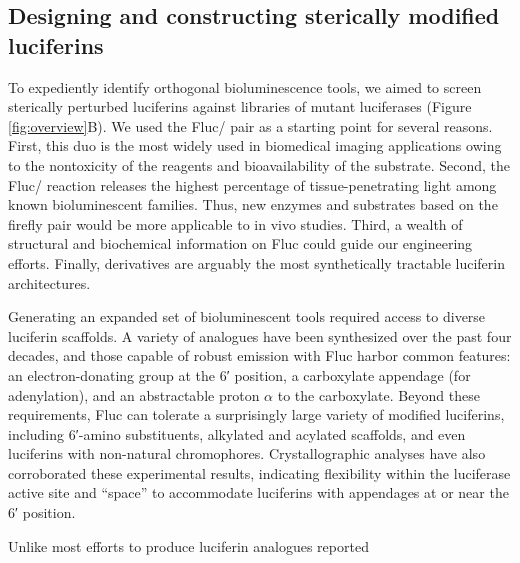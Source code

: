 \subsection*{Designing and constructing sterically modified luciferins}
To expediently identify orthogonal bioluminescence
tools, we aimed to screen sterically perturbed luciferins
against libraries of mutant luciferases (Figure \ref{fig:overview}B). We used the
Fluc/\dluciferin{} pair as a starting point for several reasons. First,
this duo is the most widely used in biomedical imaging
applications owing to the nontoxicity of the reagents and
bioavailability of the substrate.\cite{Berger:2008eq, Contag:1997kh} Second, the Fluc/\dluciferin{}
reaction releases the highest percentage of tissue-penetrating
light among known bioluminescent families.\cite{Zhao:2005if} Thus, new
enzymes and substrates based on the firefly pair would be more
applicable to in vivo studies. Third, a wealth of structural and
biochemical information on Fluc could guide our engineering
efforts.\cite{RN45, BRANCHINI:2001gr, Branchini:2003kt, Sundlov:2012kn, Nakatsu:2006jj} Finally, \dluciferin{} derivatives are arguably the
most synthetically tractable luciferin architectures.\cite{McCutcheon:2015bs, Meroni:2009tu}
\par
Generating an expanded set of bioluminescent tools required
access to diverse luciferin scaffolds. A variety of \dluciferin{}
analogues have been synthesized over the past four
decades,\cite{BRANCHINI:1989vn, Mofford:2014iw, White:1965by,WHITE:1966ig, Woodroofe:2012vx, McCutcheon:2012ix, Conley:2012gh} and those capable of robust emission with
Fluc harbor common features: an electron-donating group at
the 6′ position, a carboxylate appendage (for adenylation), and
an abstractable proton $\alpha{}$ to the carboxylate.\cite{White:1966gs, Branchini:2015ep} Beyond these
requirements, Fluc can tolerate a surprisingly large variety of
modified luciferins,\cite{Meroni:2009tu, White:1966ig, SELIGER:1961dl} including 6′-amino substituents,\cite{RN98, Reddy:2010gaa, White:1966ig}
alkylated\cite{Woodroofe:2008iw, Kojima:2012fg, Wang:2017bc} and acylated\cite{Kuchimaru:2016eb} scaffolds, and even
luciferins with non-natural chromophores.\cite{Kuchimaru:2016eb, Jathoul:2014do} Crystallographic
analyses have also corroborated these experimental results,
indicating flexibility within the luciferase active site and “space”
to accommodate luciferins with appendages at or near the 6′
position.\cite{Sundlov:2012kn, Nakatsu:2006jj}
\par
Unlike most efforts to produce luciferin analogues reported
